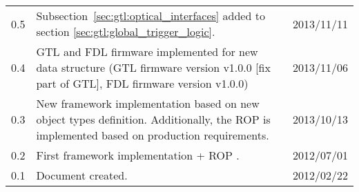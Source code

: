 \begin{longtable}{|c|p{}|c|}
0.5 & Subsection~\ref{sec:gtl:optical_interfaces} added to section \ref{sec:gtl:global_trigger_logic}. & 2013/11/11\\
0.4 & GTL and FDL firmware implemented for new data structure (GTL firmware version v1.0.0 [fix part of GTL], FDL firmware version v1.0.0) & 2013/11/06\\
0.3 & New framework implementation based on new object types definition. Additionally, the ROP is implemented based on production requirements. & 2013/10/13\\
0.2 & First framework implementation + ROP . & 2012/07/01\\
0.1 & Document created. & 2012/02/22\\
\hline
\end{longtable}

\clearpage{}
